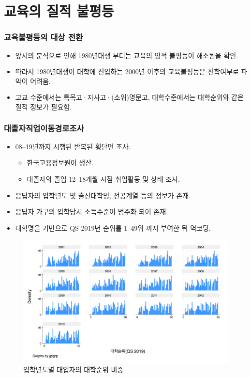 \documentclass[aspectratio=169,xcolor=dvipsnames,handout]{beamer}
\begin{document}
\section{교육의 질적 불평등}
\begin{frame}[<+->]
\frametitle{교육불평등의 대상 전환}
    \begin{itemize}[<+->]
        \item 앞서의 분석으로 인해 1980년대생 부터는 교육의 양적 불평등이 해소됨을 확인.
        \item 따라서 1980년대생이 대학에 진입하는 2000년 이후의 교육불평등은 진학여부로 파악이 어려움.
        \item 고교 수준에서는 특목고·자사고·(소위)명문고, 대학수준에서는 대학순위와 같은 질적 정보가 필요함.
    \end{itemize}
\end{frame}

\begin{frame}[<+->]
\frametitle{대졸자직업이동경로조사}
    \begin{itemize}[<+->]
        \item 08--19년까지 시행된 반복된 횡단면 조사.
        \begin{itemize}[<+->]
            \item 한국고용정보원이 생산.
            \item 대졸자의 졸업 12--18개월 시점 취업활동 및 상태 조사.
        \end{itemize}
        \item 응답자의 입학년도 및 출신대학명, 전공계열 등의 정보가 존재.
        \item 응답자 가구의 입학당시 소득수준이 범주화 되어 존재.
        \item 대학명을 기반으로  QS 2019년 순위를 1--49위 까지 부여한 뒤 역코딩.
    \end{itemize}
\end{frame}

\begin{frame}[<+->]
    \begin{figure}
        \centering
        \includegraphics[width=.75\textwidth]{pic/edug1.png}
        \caption{입학년도별 대입자의 대학순위 비중}
    \end{figure}
\end{frame}
\end{document}
